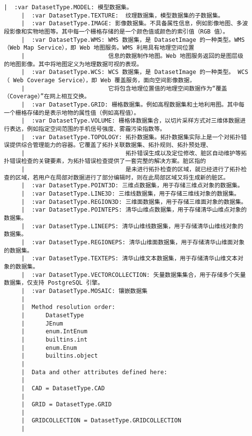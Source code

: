 \documentclass[11pt]{article}
\begin{document}
\begin{Verbatim}[commandchars=\\\{\}]
     |  :var DatasetType.MODEL: 模型数据集。
     |  :var DatasetType.TEXTURE:  纹理数据集，模型数据集的子数据集。
     |  :var DatasetType.IMAGE: 影像数据集。不具备属性信息，例如影像地图、多波段影像和实物地图等。其中每一个栅格存储的是一个颜色值或颜色的索引值（RGB 值）。
     |  :var DatasetType.WMS: WMS 数据集，是 DatasetImage 的一种类型。WMS （Web Map Service），即 Web 地图服务。WMS 利用具有地理空间位置
     |                        信息的数据制作地图。Web 地图服务返回的是图层级的地图影像。其中将地图定义为地理数据可视的表现。
     |  :var DatasetType.WCS: WCS 数据集，是 DatasetImage 的一种类型。 WCS（ Web Coverage Service），即 Web 覆盖服务，面向空间影像数据，
     |                        它将包含地理位置值的地理空间数据作为“覆盖（Coverage）”在网上相互交换。
     |  :var DatasetType.GRID: 栅格数据集。例如高程数据集和土地利用图。其中每一个栅格存储的是表示地物的属性值（例如高程值）。
     |  :var DatasetType.VOLUME: 栅格体数据集合，以切片采样方式对三维体数据进行表达，例如指定空间范围的手机信号强度、雾霾污染指数等。
     |  :var DatasetType.TOPOLOGY: 拓扑数据集。拓扑数据集实际上是一个对拓扑错误提供综合管理能力的容器。它覆盖了拓扑关联数据集、拓扑规则、拓扑预处理、
     |                             拓扑错误生成以及定位修改、脏区自动维护等拓扑错误检查的关键要素，为拓扑错误检查提供了一套完整的解决方案。脏区指的
     |                             是未进行拓扑检查的区域，就已经进行了拓扑检查的区域，若用户在局部对数据进行了部分编辑时，则在此局部区域又将生成新的脏区。
     |  :var DatasetType.POINT3D: 三维点数据集，用于存储三维点对象的数据集。
     |  :var DatasetType.LINE3D: 三维线数据集，用于存储三维线对象的数据集。
     |  :var DatasetType.REGION3D: 三维面数据集，用于存储三维面对象的数据集。
     |  :var DatasetType.POINTEPS: 清华山维点数据集，用于存储清华山维点对象的数据集。
     |  :var DatasetType.LINEEPS: 清华山维线数据集，用于存储清华山维线对象的数据集。
     |  :var DatasetType.REGIONEPS: 清华山维面数据集，用于存储清华山维面对象的数据集。
     |  :var DatasetType.TEXTEPS: 清华山维文本数据集，用于存储清华山维文本对象的数据集。
     |  :var DatasetType.VECTORCOLLECTION: 矢量数据集集合，用于存储多个矢量数据集，仅支持 PostgreSQL 引擎。
     |  :var DatasetType.MOSAIC: 镶嵌数据集
     |  
     |  Method resolution order:
     |      DatasetType
     |      JEnum
     |      enum.IntEnum
     |      builtins.int
     |      enum.Enum
     |      builtins.object
     |  
     |  Data and other attributes defined here:
     |  
     |  CAD = DatasetType.CAD
     |  
     |  GRID = DatasetType.GRID
     |  
     |  GRIDCOLLECTION = DatasetType.GRIDCOLLECTION
     |  

\end{Verbatim}
\end{document}
